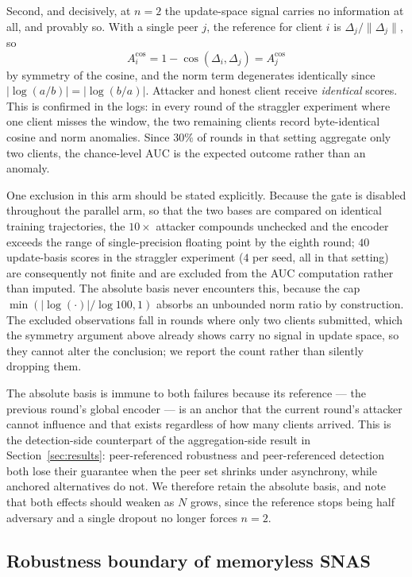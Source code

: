 \documentclass[pdflatex,sn-mathphys-num]{sn-jnl}
\begin{document}
Second, and decisively, at $n=2$ the update-space signal carries no information at all, and provably so. With a single peer $j$, the reference for client $i$ is $\Delta_j/\lVert\Delta_j\rVert$, so
\[
A^{\mathrm{cos}}_i = 1 - \cos(\Delta_i, \Delta_j) = A^{\mathrm{cos}}_j
\]
by symmetry of the cosine, and the norm term degenerates identically since $\lvert\log(a/b)\rvert = \lvert\log(b/a)\rvert$. Attacker and honest client receive \emph{identical} scores. This is confirmed in the logs: in every round of the straggler experiment where one client misses the window, the two remaining clients record byte-identical cosine and norm anomalies. Since $30\%$ of rounds in that setting aggregate only two clients, the chance-level AUC is the expected outcome rather than an anomaly.

One exclusion in this arm should be stated explicitly. Because the gate is disabled throughout the parallel arm, so that the two bases are compared on identical training trajectories, the $10\times$ attacker compounds unchecked and the encoder exceeds the range of single-precision floating point by the eighth round; $40$ update-basis scores in the straggler experiment ($4$ per seed, all in that setting) are consequently not finite and are excluded from the AUC computation rather than imputed. The absolute basis never encounters this, because the cap $\min(\lvert\log(\cdot)\rvert/\log 100, 1)$ absorbs an unbounded norm ratio by construction. The excluded observations fall in rounds where only two clients submitted, which the symmetry argument above already shows carry no signal in update space, so they cannot alter the conclusion; we report the count rather than silently dropping them.

The absolute basis is immune to both failures because its reference --- the previous round's global encoder --- is an anchor that the current round's attacker cannot influence and that exists regardless of how many clients arrived. This is the detection-side counterpart of the aggregation-side result in Section~\ref{sec:results}: peer-referenced robustness and peer-referenced detection both lose their guarantee when the peer set shrinks under asynchrony, while anchored alternatives do not. We therefore retain the absolute basis, and note that both effects should weaken as $N$ grows, since the reference stops being half adversary and a single dropout no longer forces $n=2$.

\subsection{Robustness boundary of memoryless SNAS}
\end{document}
